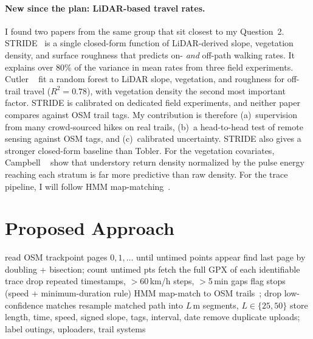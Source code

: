 \documentclass[10pt,twocolumn,letterpaper]{article}
\begin{document}
\paragraph{New since the plan: LiDAR-based travel rates.}
I found two papers from the same group that sit closest to my Question~2. STRIDE~\cite{campbell2024stride} is a single closed-form function of LiDAR-derived slope, vegetation density, and surface roughness that predicts on- \emph{and} off-path walking rates. It explains over 80\% of the variance in mean rates from three field experiments. Cutler \etal~\cite{cutler2026machine} fit a random forest to LiDAR slope, vegetation, and roughness for off-trail travel ($R^2 = 0.78$), with vegetation density the second most important factor.
STRIDE is calibrated on dedicated field experiments, and neither paper compares against OSM trail tags. My contribution is therefore (a)~supervision from many crowd-sourced hikes on real trails, (b)~a head-to-head test of remote sensing against OSM tags, and (c)~calibrated uncertainty. STRIDE also gives a stronger closed-form baseline than Tobler.
For the vegetation covariates, Campbell \etal~\cite{campbell2018understory} show that understory return density normalized by the pulse energy reaching each stratum is far more predictive than raw density. For the trace pipeline, I will follow HMM map-matching~\cite{newson2009hidden}.

\section{Proposed Approach}
\label{sec:approach}

\begin{algorithm}[t]
\caption{T1 trajectory pipeline for one region.}
\label{alg:t1}
\begin{algorithmic}[1]
\small
{}
  \State read OSM trackpoint pages $0,1,\dots$ until untimed points appear
  \State find last page by doubling + bisection; count untimed pts
  \State fetch the full GPX of each identifiable trace
\EndFor
{}
  \State drop repeated timestamps, $>$60\,km/h steps, $>$5\,min gaps
  \State flag stops (speed + minimum-duration rule)
  \State HMM map-match to OSM trails~\cite{newson2009hidden}; drop low-confidence matches
  \State resample matched path into $L$\,m segments, $L\!\in\!\{25,50\}$
  \State store length, time, speed, signed slope, tags, interval, date
\EndFor
\State remove duplicate uploads; label outings, uploaders, trail systems
\end{algorithmic}
\end{algorithm}
\end{document}
